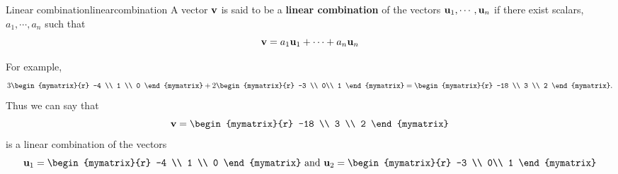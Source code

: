 \begin{definition}{Linear combination}{linearcombination}
A vector ${\bf v}$ is said to be a \textbf{linear combination} of the vectors ${\bf u}_1,\cdots , {\bf u}_n $ 
if there exist scalars, $a_{1},\cdots ,a_{n}$ such
that
\begin{equation*}
{\bf v} = a_1 {\bf u}_1 + \cdots + a_n {\bf u}_n
\end{equation*}
\end{definition}

For example, 
\begin{equation*}
3
\begin{mymatrix}{r}
-4 \\
1 \\
0
\end{mymatrix}
+
2
\begin{mymatrix}{r}
-3 \\
0\\
1
\end{mymatrix}
 =
\begin{mymatrix}{r}
-18 \\
3 \\
2
\end{mymatrix}. 
\end{equation*}
Thus we can say that
\begin{equation*}
\vect{v}= \begin{mymatrix}{r}
-18 \\
3 \\
2
\end{mymatrix}
\end{equation*}
is a linear combination of the vectors 
\begin{equation*}
\vect{u}_1 = \begin{mymatrix}{r}
-4 \\
1 \\
0
\end{mymatrix}
\mbox{ and } 
\vect{u}_2 = 
\begin{mymatrix}{r}
-3 \\
0\\
1
\end{mymatrix}
\end{equation*}

